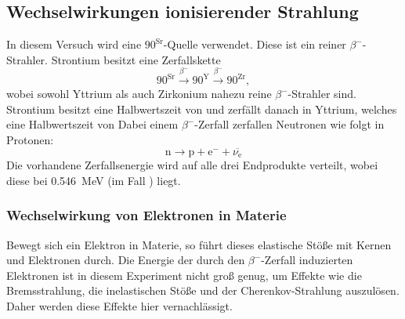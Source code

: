 \subsection{Wechselwirkungen ionisierender Strahlung}
In diesem Versuch wird eine ${90}^\text{Sr}$-Quelle verwendet. Diese ist ein reiner
$\beta^{-}$-Strahler. Strontium besitzt eine Zerfallskette
\begin{equation*}
  {90}^\text{Sr} \stackrel{\beta^{-}}{\longrightarrow} {90}^\text{Y}
  \stackrel{\beta^{-}}{\longrightarrow} {90}^\text{Zr},
\end{equation*}
wobei sowohl Yttrium als auch Zirkonium nahezu reine $\beta^{-}$-Strahler sind.
Strontium besitzt eine Halbwertszeit von
und zerfällt danach in Yttrium, welches eine Halbwertszeit von
Dabei einem $\beta^{-}$-Zerfall zerfallen Neutronen wie folgt in Protonen:
\begin{equation*}
  \text{n} \rightarrow \text{p} + \text{e}^{-} + \overline{\nu_\text{e}}
\end{equation*}
Die vorhandene Zerfallsenergie wird auf alle drei Endprodukte verteilt, wobei diese
bei \SI{0.546}{\mega\electronvolt} (im Fall ) liegt.

\subsubsection{Wechselwirkung von Elektronen in Materie}
Bewegt sich ein Elektron in Materie, so führt dieses elastische Stöße mit Kernen und
Elektronen durch. Die Energie der durch den $\beta^{-}$-Zerfall induzierten Elektronen
ist in diesem Experiment nicht groß genug, um Effekte wie die Bremsstrahlung, die
inelastischen Stöße und der Cherenkov-Strahlung auszulösen. Daher werden
diese Effekte hier vernachlässigt.

